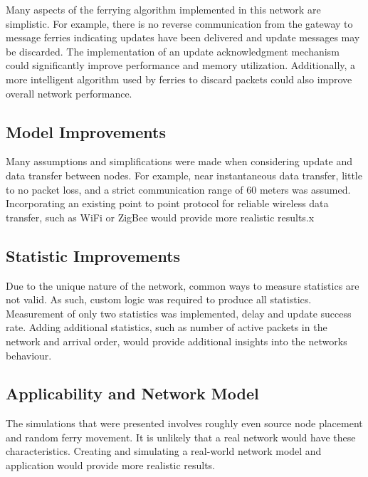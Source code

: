 Many aspects of the ferrying algorithm implemented in this network are simplistic.
For example, there is no reverse communication from the gateway to message ferries indicating updates have been delivered and update messages may be discarded.
The implementation of an update acknowledgment mechanism could significantly improve performance and memory utilization.
Additionally, a more intelligent algorithm used by ferries to discard packets could also improve overall network performance.

\subsection{Model Improvements}

Many assumptions and simplifications were made when considering update and data transfer between nodes.
For example, near instantaneous data transfer, little to no packet loss, and a strict communication range of 60 meters was assumed.
Incorporating an existing point to point protocol for reliable wireless data transfer, such as WiFi or ZigBee would provide more realistic results.x

\subsection{Statistic Improvements}

Due to the unique nature of the network, common ways to measure statistics are not valid.
As such, custom logic was required to produce all statistics.
Measurement of only two statistics was implemented, delay and update success rate.
Adding additional statistics, such as number of active packets in the network and arrival order, would provide additional insights into the networks behaviour.

\subsection{Applicability and Network Model}

The simulations that were presented involves roughly even source node placement and random ferry movement.
It is unlikely that a real %
network would have these characteristics.
Creating and simulating a real-world network model and application would provide more realistic results.
